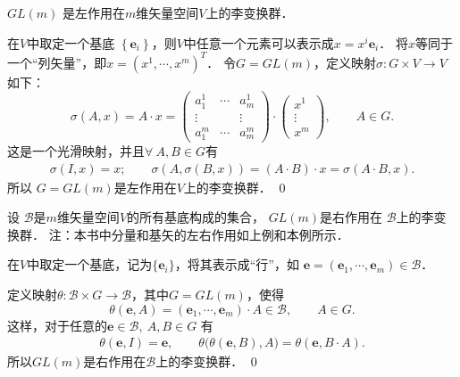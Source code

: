 \begin{example}\label{chlg:exm_GLonV}
    $ GL(m)$ 是左作用在$m$维矢量空间$V$上的李变换群．
\end{example}

在$V$中取定一个基底 $\left\{\boldsymbol{e}_i\right\}$，则$V$中任意一个元素可以表示成$x= x^i \boldsymbol{e}_i$．
将$x$等同于一个“列矢量”，即$x=\left(x^1, \cdots, x^m\right)^T$．
令$G=GL(m)$，定义映射$\sigma: G \times V \rightarrow V$ 如下：
\begin{equation*}
    \sigma(A, x)=A \cdot x=\left(\begin{array}{ccc}
        a_1^1 & \cdots & a_m^1 \\
        \vdots & & \vdots \\
        a_1^m & \cdots & a_m^m
    \end{array}\right) \cdot\left(\begin{array}{c}
        x^1 \\
        \vdots \\
        x^m
    \end{array}\right) ,\qquad A\in G.
\end{equation*}
这是一个光滑映射，并且$\forall \ A, B \in G$有
\begin{align*}
    \sigma(I, x)=x; \qquad
    \sigma(A, \sigma(B, x))=(A \cdot B) \cdot x=\sigma(A \cdot B, x).
\end{align*}
所以 $G=GL(m)$是左作用在$V$上的李变换群．
\qed

\begin{example}\label{chlg:exm_GLonB}
    设 $\mathscr{B}$是$m$维矢量空间$V$的所有基底构成的集合，
    $GL(m)$是右作用在 $\mathscr{B}$上的李变换群．
    注：本书中分量和基矢的左右作用如上例和本例所示．
\end{example}

在$V$中取定一个基底，记为$\{\boldsymbol{e}_i\}$，将其表示成“行”，如
$\boldsymbol{e}=\left(\boldsymbol{e}_1, \cdots, \boldsymbol{e}_m\right) \in \mathscr{B}$．

定义映射$\theta: \mathscr{B} \times G \rightarrow \mathscr{B}$，其中$G=GL(m)$，使得
\begin{equation*}
    \theta(\boldsymbol{e}, A)=\left(\boldsymbol{e}_1, \cdots, 
    \boldsymbol{e}_m\right) \cdot A \in \mathscr{B},\qquad A\in G .
\end{equation*}
这样，对于任意的$\boldsymbol{e} \in \mathscr{B},\ A, B \in G$ 有
\begin{align*}
    \theta(\boldsymbol{e}, I) =\boldsymbol{e}, \qquad
    \theta\bigl(\theta(\boldsymbol{e}, B), A\bigr)  
    =\theta(\boldsymbol{e}, B \cdot A).
\end{align*}
所以$GL(m)$是右作用在$\mathscr{B}$上的李变换群．
\qed

